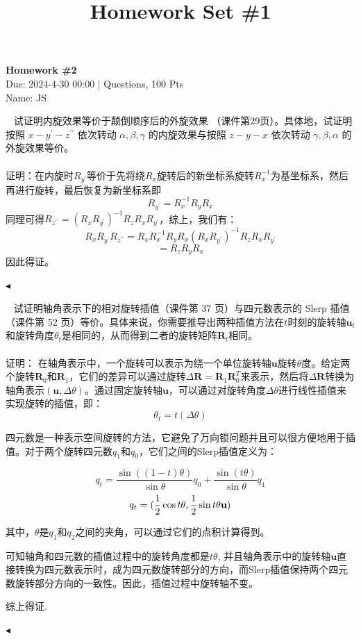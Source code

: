 \documentclass[11pt]{article}
\title{Homework Set \#1}
\newenvironment{question}[2][Question]{\begin{trivlist}
\item[\hskip \labelsep {\bfseries #1}\hskip \labelsep {\bfseries #2.}]}{\hfill$\blacktriangleleft$\end{trivlist}}
\begin{document}
    \pagestyle{fancy}
    \lhead{}
    \chead{}

    \begin{center}
        {\LARGE \bf Homework \#2}\\
        {Due: 2024-4-30 00:00 \quad$|$ Questions, 100 Pts}\\
        {Name: JS}
    \end{center}
    \begin{question}{1 (20') (欧拉角表示)}~
    试证明内旋效果等价于颠倒顺序后的外旋效果 （课件第29页）。具体地，试证明按照 $x-y^{\prime}-z^{\prime\prime}$ 依次转动 $\alpha,\beta,\gamma$ 的内旋效果与按照 $z-y-x$ 依次转动 $\gamma,\beta,\alpha$ 的外旋效果等价。
    \\
    \\
    证明：在内旋时$R_{y^\prime}$等价于先将绕$R_x$旋转后的新坐标系旋转$R_{x}^{-1}$为基坐标系，然后再进行旋转，最后恢复为新坐标系即
    \[R_{y^\prime} = R_{x}^{-1} R_y R_{x}\]
    同理可得$R_{z^{\prime\prime}} = ({ R_x R_{y^\prime}})^{-1} R_z R_x R_{y^\prime}$，综上，我们有：
    \[R_x R_{y^\prime} R_{z^{\prime\prime}} = R_x  R_{x}^{-1} R_y R_{x} ({ R_x R_{y^\prime}})^{-1} R_z R_x R_{y^\prime}\]
    \[ = R_z R_y R_x\]
    因此得证。
  
  \end{question}
    
  \begin{question}{2 (20') (轴角表示、四元数表示)}~
    试证明轴角表示下的相对旋转插值（课件第 37 页）与四元数表示的 Slerp 插值（课件第 52 页）等价。具体来说，你需要推导出两种插值方法在$t$时刻的旋转轴$\bm{u}_t$和旋转角度$\theta_t$是相同的，从而得到二者的旋转矩阵$\mathbf{R}_t$相同。
    \\
    \\
    证明：
  在轴角表示中，一个旋转可以表示为绕一个单位旋转轴\( \mathbf{u} \)旋转\( \theta \)度。给定两个旋转\( \mathbf{R}_0 \)和\( \mathbf{R}_1 \)，它们的差异可以通过旋转\( \Delta\mathbf{R} = \mathbf{R}_1\mathbf{R}_0^{T} \)来表示，然后将\( \Delta\mathbf{R} \)转换为轴角表示\( (\mathbf{u}, \Delta\theta) \)。通过固定旋转轴\( \mathbf{u} \)，可以通过对旋转角度\( \Delta\theta \)进行线性插值来实现旋转的插值，即：
  \[ \theta_t = t(\Delta\theta) \]

  四元数是一种表示空间旋转的方法，它避免了万向锁问题并且可以很方便地用于插值。对于两个旋转四元数\( q_1 \)和\( q_0 \)，它们之间的Slerp插值定义为：
    
  \[ q_t = \frac{\sin((1-t)\theta)}{\sin\theta}q_0 + \frac{\sin(t\theta)}{\sin\theta}q_1 \]
  \[
   q_t = (\frac{1}{2} \cos {t \theta} , \frac{1}{2} \sin{ t \theta} \vb{u})
  \]
    
  其中，\( \theta \)是\( q_1 \)和\( q_2 \)之间的夹角，可以通过它们的点积计算得到。 
  
  可知轴角和四元数的插值过程中的旋转角度都是$t \theta$, 并且轴角表示中的旋转轴\( \mathbf{u} \)直接转换为四元数表示时，成为四元数旋转部分的方向，而Slerp插值保持两个四元数旋转部分方向的一致性。因此，插值过程中旋转轴不变。

  综上得证.

  
  \end{question}
    
\end{document}

